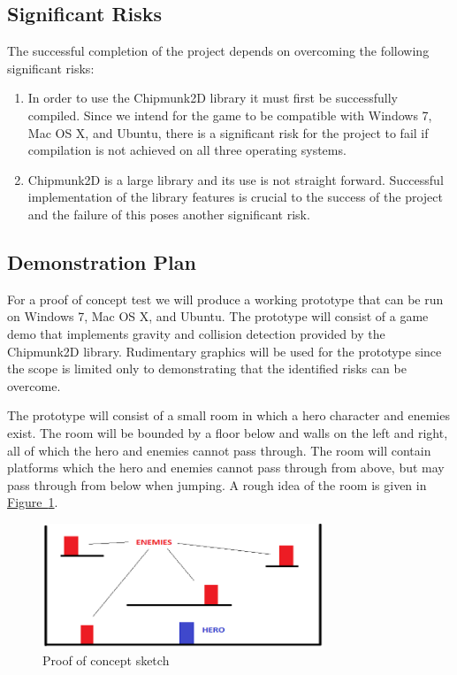 \documentclass[12pt, titlepage]{article}
\begin{document}
\subsection{Significant Risks}
The successful completion of the project depends on overcoming the following significant risks:
\begin{enumerate}
  \item In order to use the Chipmunk2D library it must first be successfully compiled.  Since we intend for the game to be compatible with Windows 7, Mac OS X, and Ubuntu, there is a significant risk for the project to fail if compilation is not achieved on all three operating systems.
  \item Chipmunk2D is a large library and its use is not straight forward.  Successful implementation of the library features is crucial to the success of the project and the failure of this poses another significant risk.
\end{enumerate}


\subsection{Demonstration Plan}

For a proof of concept test we will produce a working prototype that can be run on Windows 7, Mac OS X, and Ubuntu.  The prototype will consist of a game demo that implements gravity and collision detection provided by the Chipmunk2D library.  Rudimentary graphics will be used for the prototype since the scope is limited only to demonstrating that the identified risks can be overcome.

The prototype will consist of a small room in which a hero character and enemies exist.  The room will be bounded by a floor below and walls on the left and right, all of which the hero and enemies cannot pass through.  The room will contain platforms which the hero and enemies cannot pass through from above, but may pass through from below when jumping.  A rough idea of the room is given in \hyperref[fig:room]{Figure~\ref*{fig:room}}.

\begin{figure}[ht]
\centering
\includegraphics[width=0.75\textwidth]{demo}
\caption{Proof of concept sketch} \label{fig:room}
\end{figure}
\end{document}
